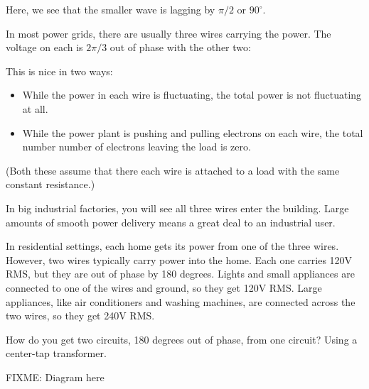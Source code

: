 Here, we see that the smaller wave is lagging by $\pi/2$ or $90^\circ$.

In most power grids, there are usually three wires carrying the power.
The voltage on each is $2\pi/3$ out of phase with the other two:


This is nice in two ways:
\begin{itemize}
\item While the power in each wire is fluctuating, the total power is not fluctuating at all.
\item While the power plant is pushing and pulling electrons on each
  wire, the total number number of electrons leaving the load is zero.
\end{itemize}
(Both these assume that there each wire is attached to a load with the same constant resistance.)

In big industrial factories, you will see all three wires enter the
building. Large amounts of smooth power delivery means a great deal to an
industrial user.

In residential settings, each home gets its power from one of the three
wires. However, two wires typically carry power into the home. Each
one carries 120V RMS, but they are out of phase by 180 degrees. Lights
and small appliances are connected to one of the wires and ground, so
they get 120V RMS. Large appliances, like air conditioners and
washing machines, are connected across the two wires, so they get 240V
RMS.



How do you get two circuits, 180 degrees out of phase, from one
circuit?  Using a center-tap transformer.

FIXME: Diagram here




